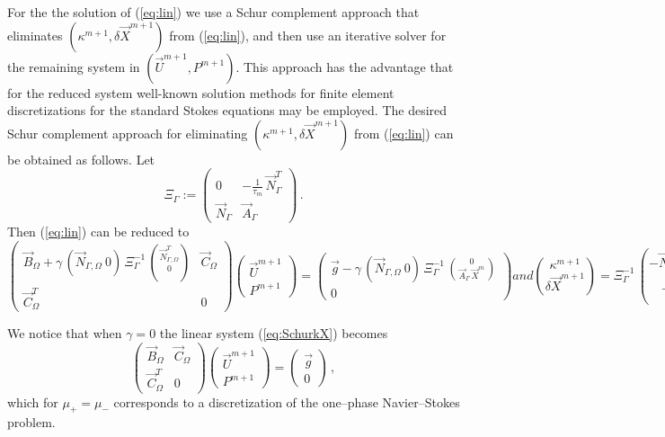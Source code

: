 \documentclass[a4paper,12pt,onecolumn]{article}
\newcommand{\NbulkT}{\vec{N}_{\Gamma,\Omega}^T}
\newcommand{\Nbulk}{\vec{N}_{\Gamma,\Omega}}
\begin{document}
For the the solution of (\ref{eq:lin}) we use a Schur complement approach that
eliminates $(\kappa^{m+1}, \delta \vec X^{m+1})$ from (\ref{eq:lin}), and then
use an iterative solver for the remaining system in $(\vec U^{m+1}, P^{m+1})$.
This approach has the advantage that for the reduced system well-known solution
methods for finite element discretizations for the standard Stokes equations may
be employed. The desired Schur complement approach for eliminating
$(\kappa^{m+1},\delta \vec X^{m+1})$ from (\ref{eq:lin}) can be obtained as
follows. Let
\begin{equation} \label{eq:Xi}
\Xi_\Gamma:= 
\begin{pmatrix}
 0 & - \frac1{\tau_m}\,\vec{N}_\Gamma^T \\
\vec{N}_\Gamma & \vec{A}_\Gamma
\end{pmatrix} \,.
\end{equation}
Then (\ref{eq:lin}) can be reduced to
\begin{subequations}
\begin{equation} \label{eq:SchurkX}
\begin{pmatrix}
\vec B_\Omega + \gamma\,(\Nbulk \ 0)\,\Xi_\Gamma^{-1}\,
\binom{\NbulkT}{0} & \vec C_\Omega \\
\vec C_\Omega^T & 0
\end{pmatrix}
\begin{pmatrix}
\vec U^{m+1} \\ 
P^{m+1}
\end{pmatrix}
= 
\begin{pmatrix}
\vec g
-\gamma\,(\Nbulk \ 0)\, \Xi_\Gamma^{-1}\,
\binom{0}{\vec{A}_\Gamma\,\vec{X}^{m}} \\
0
\end{pmatrix}
\end{equation}
and
\begin{equation} \label{eq:SchurkXb}
\binom{\kappa^{m+1}}{\delta\vec{X}^{m+1}} = \Xi_\Gamma^{-1}\,
\binom{-\NbulkT\,\vec U^{m+1}}{-\vec{A}_\Gamma\,\vec{X}^{m}}\,.
\end{equation}
\end{subequations}

We notice that when $\gamma = 0$ the linear system (\ref{eq:SchurkX}) becomes
\begin{equation} \label{eq:stokes_system}
\begin{pmatrix}
\vec B_\Omega & \vec C_\Omega \\
\vec C_\Omega^T & 0
\end{pmatrix}
\begin{pmatrix}
\vec U^{m+1} \\ 
P^{m+1}
\end{pmatrix}
= 
\begin{pmatrix}
\vec g \\
0
\end{pmatrix}\,,
\end{equation}
which for $\mu_+=\mu_-$ corresponds to a discretization of the one--phase
Navier--Stokes problem.
\end{document}

